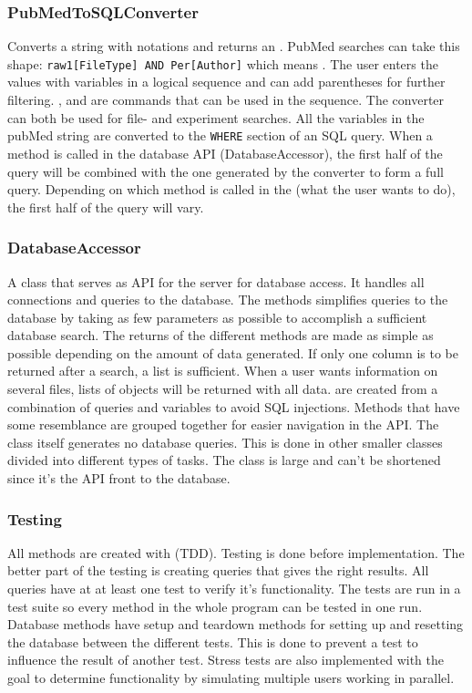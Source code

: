 \subsubsection{PubMedToSQLConverter}
Converts a string with  notations and returns an . PubMed searches can take this shape: \texttt{raw1[FileType] AND Per[Author]} which means . The user enters the values with variables in a logical sequence and can add parentheses for further filtering. ,  and  are commands that can be used in the sequence. The converter can both be used for file- and experiment searches. All the variables in the pubMed string are converted to the \texttt{WHERE} section of an SQL query. When a method is called in the database API (DatabaseAccessor), the first half of the query will be combined with the one generated by the converter to form a full query. Depending on which method is called in the  (what the user wants to do), the first half of the query will vary.

\subsubsection{DatabaseAccessor}
A class that serves as API for the server for database access. It handles all connections and queries to the database. The methods simplifies queries to the database by taking as few parameters as possible to accomplish a sufficient database search. The returns of the different methods are made as simple as possible depending on the amount of data generated. If only one column is to be returned after a search, a list is sufficient. When a user wants information on several files, lists of objects will be returned with all data.  are created from a combination of queries and variables to avoid SQL injections. Methods that have some resemblance are grouped together for easier navigation in the API. The class itself generates no database queries. This is done in other smaller classes divided into different types of tasks. The class is large and can't be shortened since it's the API front to the database.

\subsubsection{Testing}
All methods are created with  (TDD). Testing is done before implementation. The better part of the testing is creating queries that gives the right results. All queries have at at least one test to verify it's functionality. The tests are run in a test suite so every method in the whole program can be tested in one run. Database methods have setup and teardown methods for setting up and resetting the database between the different tests. This is done to prevent a test to influence the result of another test. Stress tests are also implemented with the goal to determine functionality by simulating multiple users working in parallel.